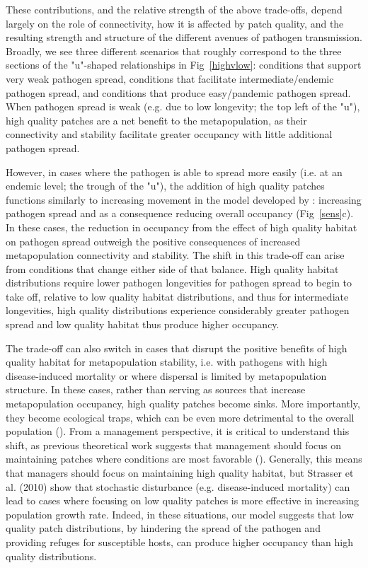 \documentclass{svjour3}
\begin{document}
These contributions, and the relative strength of the above trade-offs, depend largely on the role of connectivity, how it is affected by patch quality, and the resulting strength and structure of the different avenues of pathogen transmission.  Broadly, we see three different scenarios that roughly correspond to the three sections of the "u"-shaped relationships in Fig~\ref{highvlow}: conditions that support very weak pathogen spread, conditions that facilitate intermediate/endemic pathogen spread, and conditions that produce easy/pandemic pathogen spread.  When pathogen spread is weak (e.g. due to low longevity; the top left of the "u"), high quality patches are a net benefit to the metapopulation, as their connectivity and stability facilitate greater occupancy with little additional pathogen spread.  

However, in cases where the pathogen is able to spread more easily (i.e. at an endemic level; the trough of the "u"), the addition of high quality patches functions similarly to increasing movement in the model developed by \cite{Hess1996}: increasing pathogen spread and as a consequence reducing overall occupancy (Fig~\ref{sens}c).  In these cases, the reduction in occupancy from the effect of high quality habitat on pathogen spread outweigh the positive consequences of increased metapopulation connectivity and stability.  The shift in this trade-off can arise from conditions that change either side of that balance.  High quality habitat distributions require lower pathogen longevities for pathogen spread to begin to take off, relative to low quality habitat distributions, and thus for intermediate longevities, high quality distributions experience considerably greater pathogen spread and low quality habitat thus produce higher occupancy.  

The trade-off can also switch in cases that disrupt the positive benefits of high quality habitat for metapopulation stability, i.e. with pathogens with high disease-induced mortality or where dispersal is limited by metapopulation structure.  In these cases, rather than serving as sources that increase metapopulation occupancy, high quality patches become sinks.  More importantly, they become ecological traps, which can be even more detrimental to the overall population (\cite{Kristan2003}).  From a management perspective, it is critical to understand this shift, as previous theoretical work suggests that management should focus on maintaining patches where conditions are most favorable (\cite{Strasser2010}).  Generally, this means that managers should focus on maintaining high quality habitat, but Strasser et al. (2010) show that stochastic disturbance (e.g. disease-induced mortality) can lead to cases where focusing on low quality patches is more effective in increasing population growth rate.  Indeed, in these situations, our model suggests that low quality patch distributions, by hindering the spread of the pathogen and providing refuges for susceptible hosts, can produce higher occupancy than high quality distributions.  
\end{document}
